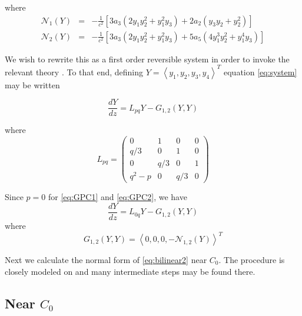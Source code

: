 where
\begin{subequations}
\begin{eqnarray}
\mathcal{N}_1\left(Y\right) &=& - \frac{1}{c^2}\left[  3 a_3 \left( 2 y_1 y_2^2 + y_1^2 y_3 \right) + 2 a_2\left( y_3 y_2 + y_2^2\right) \right] \\
\mathcal{N}_2\left(Y\right) &=& - \frac{1}{c^2}\left[ 3 a_3 \left( 2 y_1 y_2^2 + y_1^2 y_3\right) + 5 a_5 \left( 4 y_1^3 y_2^2 + y_1^4 y_3 \right) \right]
\end{eqnarray}
\end{subequations}

We wish to rewrite this as a first order reversible system in order to invoke the relevant theory \cite{IA}. 
To that end, defining  $Y=\left<y_1,y_2,y_3,y_4\right>^T$ equation \eqref{eq:system} may be written 

\begin{equation}\label{eq:bilinear}
\frac{ dY }{ dz } = L_{pq} Y - G_{1,2}(Y,Y)
\end{equation}

where 
\begin{equation}
L_{pq} = \left( 
\begin{array}{cccc}
0&1&0&0\\
q/3&0&1&0\\
0&q/3&0&1\\
q^2 - p &0&q/3&0 \end{array} \right)
 \end{equation}

Since $p=0$ for \eqref{eq:GPC1} and \eqref{eq:GPC2}, we have 
\begin{equation} \label{eq:bilinear2}
 \frac{ dY }{ dz } = L_{0q} Y - G_{1,2}(Y,Y) 
\end{equation}
where 
\begin{equation}\label{eq:nonlinear}
G_{1,2}(Y,Y) = \left<0,0,0,-\mathcal{N}_{1,2}\left(Y\right)\right>^T
\end{equation}

Next we calculate the normal form of \eqref{eq:bilinear2} near $C_0$. The procedure is
closely modeled on \cite{IA} and many intermediate steps may be found there. 


\subsection{ Near $C_0$ }

